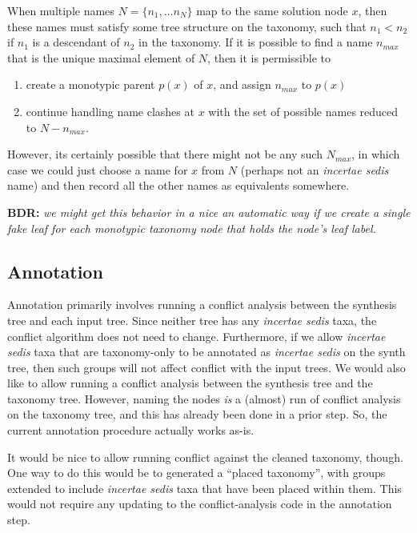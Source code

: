 \documentclass[english]{article}
\begin{document}
When multiple names $N=\{n_{1},\ldots n_{N}\}$ map to the same
solution node $x$, then these names must satisfy some tree structure
on the taxonomy, such that $n_{1}<n_{2}$ if $n_{1}$ is a descendant of
$n_{2}$ in the taxonomy.
If it is possible to find a name $n_{max}$
that is the unique maximal element of $N$, then it is permissible to
\begin{enumerate}
    \item create a monotypic parent $p(x)$ of $x$, and
assign $n_{max}$ to $p(x)$ 
    \item continue handling name clashes at $x$
with the set of possible names reduced to $N-n_{max}$.

\end{enumerate}
However, its certainly possible that there might not be any such
$N_{max}$, in which case we could just choose a name for $x$ from $N$
(perhaps not an \emph{incertae sedis} name) and then record all the
other names as equivalents somewhere.

\textbf{BDR:}\textbf{\emph{ }}\emph{we might get this behavior in a
nice an automatic way if we create a single fake leaf for each
monotypic taxonomy node that holds the node's leaf label.}


\subsection{Annotation}

Annotation primarily involves running a conflict analysis between the
synthesis tree and each input tree.
Since neither tree has any
\emph{incertae sedis} taxa, the conflict algorithm does not need to
change.
Furthermore, if we allow \emph{incertae sedis} taxa that are
taxonomy-only to be annotated as \emph{incertae sedis} on the synth
tree, then such groups will not affect conflict with the input trees.
We would also like to allow running a conflict analysis between the
synthesis tree and the taxonomy tree.
However, naming the nodes
\emph{is} a (almost) run of conflict analysis on the taxonomy tree,
and this has already been done in a prior step.
So, the current
annotation procedure actually works as-is.

It would be nice to allow running conflict against the cleaned
taxonomy, though.
One way to do this would be to generated a ``placed
taxonomy'', with groups extended to include \emph{incertae sedis} taxa
that have been placed within them.
This would not require any updating
to the conflict-analysis code in the annotation step.
\end{document}
